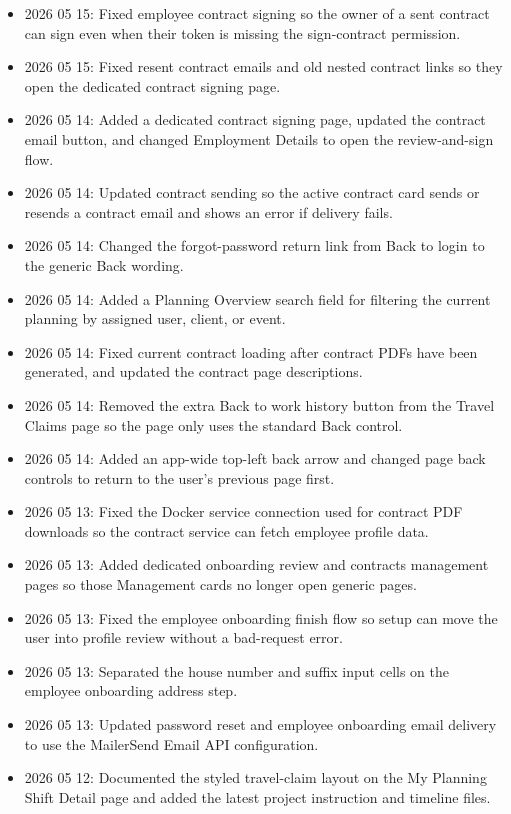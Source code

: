 \documentclass[11pt]{article}
\begin{document}
\begin{itemize}
    \item 2026 05 15: Fixed employee contract signing so the owner of a sent contract can sign even when their token is missing the sign-contract permission.
    \item 2026 05 15: Fixed resent contract emails and old nested contract links so they open the dedicated contract signing page.
    \item 2026 05 14: Added a dedicated contract signing page, updated the contract email button, and changed Employment Details to open the review-and-sign flow.
    \item 2026 05 14: Updated contract sending so the active contract card sends or resends a contract email and shows an error if delivery fails.
    \item 2026 05 14: Changed the forgot-password return link from Back to login to the generic Back wording.
    \item 2026 05 14: Added a Planning Overview search field for filtering the current planning by assigned user, client, or event.
    \item 2026 05 14: Fixed current contract loading after contract PDFs have been generated, and updated the contract page descriptions.
    \item 2026 05 14: Removed the extra Back to work history button from the Travel Claims page so the page only uses the standard Back control.
    \item 2026 05 14: Added an app-wide top-left back arrow and changed page back controls to return to the user's previous page first.
    \item 2026 05 13: Fixed the Docker service connection used for contract PDF downloads so the contract service can fetch employee profile data.
    \item 2026 05 13: Added dedicated onboarding review and contracts management pages so those Management cards no longer open generic pages.
    \item 2026 05 13: Fixed the employee onboarding finish flow so setup can move the user into profile review without a bad-request error.
    \item 2026 05 13: Separated the house number and suffix input cells on the employee onboarding address step.
    \item 2026 05 13: Updated password reset and employee onboarding email delivery to use the MailerSend Email API configuration.
    \item 2026 05 12: Documented the styled travel-claim layout on the My Planning Shift Detail page and added the latest project instruction and timeline files.

\end{itemize}
\end{document}
